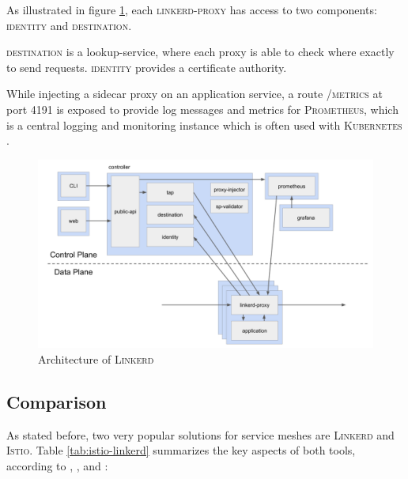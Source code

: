 As illustrated in figure \ref{fig:arch-linkerd}, each \textsc{linkerd-proxy} has access to two components: \textsc{identity} and \textsc{destination}.

\textsc{destination} is a lookup-service, where each proxy is able to check where exactly to send requests. \textsc{identity} provides a certificate authority.

While injecting a sidecar proxy on an application service, a route \textsc{/metrics} at port 4191 is exposed to provide log messages and metrics for \textsc{Prometheus}, which is a central logging and monitoring instance which is often used with \textsc{Kubernetes} \cite{linkerd-docs-arch}.

\begin{figure}
    \includegraphics[width=\columnwidth]{img/linkerd_architecture.png}
    \caption{Architecture of \textsc{Linkerd} \cite{linkerd-docs-arch}}
    \label{fig:arch-linkerd}
\end{figure}

\subsection{Comparison}

As stated before, two very popular solutions for service meshes are \textsc{Linkerd} and \textsc{Istio}. Table \ref{tab:istio-linkerd} summarizes the key aspects of both tools, according to \cite{linkerd-github}, \cite{istio-github}, \cite{istio-linkerd-compare-1} and \cite{istio-linkerd-compare-2}:

